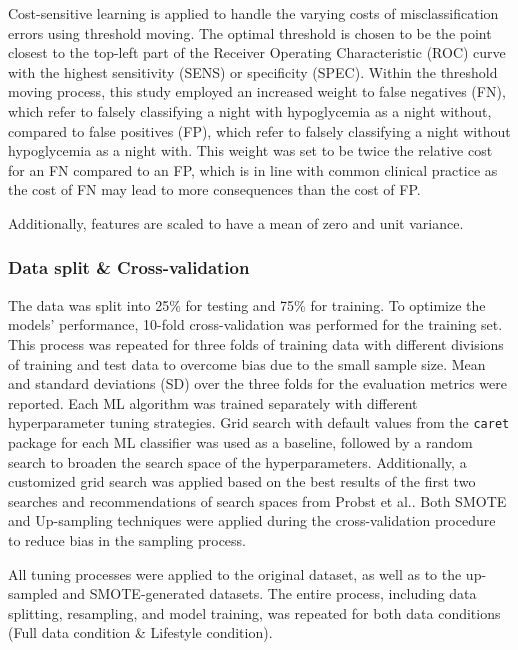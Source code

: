 Cost-sensitive learning is applied to handle the varying costs of misclassification errors using threshold moving. The optimal threshold is chosen to be the point closest to the top-left part of the Receiver Operating Characteristic (ROC) curve with the highest sensitivity (SENS) or specificity (SPEC).
Within the threshold moving process, this study employed an increased weight to false negatives (FN), which refer to falsely classifying a night with hypoglycemia as a night without, compared to false positives (FP), which refer to falsely classifying a night without hypoglycemia as a night with. This weight was set to be twice the relative cost for an FN compared to an FP, which is in line with common clinical practice \cite{ling2008cost} as the cost of FN may lead to more consequences than the cost of FP.

Additionally, features are scaled to have a mean of zero and unit variance.

\subsubsection{Data split \& Cross-validation} \label{Data split}
The data was split into 25\% for testing and 75\% for training. To optimize the models' performance, 10-fold cross-validation was performed for the training set. This process was repeated for three folds of training data with different divisions of training and test data to overcome bias due to the small sample size. Mean and standard deviations (SD) over the three folds for the evaluation metrics were reported. Each ML algorithm was trained separately with different hyperparameter tuning strategies. Grid search with default values from the \texttt{caret} package \cite{kuhn2020package} for each ML classifier was used as a baseline, followed by a random search to broaden the search space of the hyperparameters. Additionally, a customized grid search was applied based on the best results of the first two searches and recommendations of search spaces from Probst et al.\cite{probst2019tunability}. Both SMOTE and Up-sampling techniques were applied during the cross-validation procedure to reduce bias in the sampling process. 

All tuning processes were applied to the original dataset, as well as to the up-sampled and SMOTE-generated datasets. The entire process, including data splitting, resampling, and model training, was repeated for both data conditions (Full data condition \& Lifestyle condition).


